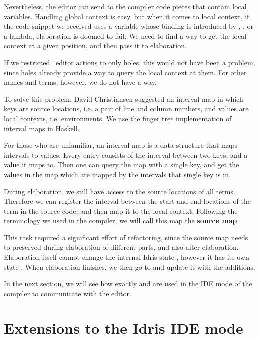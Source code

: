 Nevertheless, the editor can send to the compiler code pieces that contain local variables.
Handling global context is easy, but when it comes to local context, if the
code snippet we received uses a variable whose binding is introduced by
, , or a lambda, elaboration is doomed to fail.
We need to find a way to get the local context at a given position, and then
pass it to elaboration.

If we restricted \Elab\ editor actions to only holes, this would not have been
a problem, since holes already provide a way to query the local context at
them. For other names and terms, however, we do not have a way.

To solve this problem, David Christiansen suggested an interval map in which
keys are source locations, i.e. a pair of line and column numbers, and values
are local contexts, i.e. environments. We use the finger tree implementation of
interval maps in Haskell.\cite{fingertrees}

For those who are unfamiliar, an interval map is a data structure that maps
intervals to values. Every entry consists of the interval between two keys, and
a value it maps to. Then one can query the map with a single key, and get the
values in the map which are mapped by the intervals that single key is in.

During elaboration, we still have access to the source locations of all terms.
Therefore we can register the interval between the start and end locations of
the term in the source code, and then map it to the local context.
Following the terminology we used in the compiler, we will call this map the
\textbf{source map}.

This task required a significant effort of refactoring, since the source map
needs to preserved during elaboration of different parts, and also after
elaboration. Elaboration itself cannot change the internal Idris state
, however it has its own state . When elaboration
finishes, we then go to  and update it with the additions.

In the next section, we will see how exactly  and 
are used in the IDE mode of the compiler to communicate with the editor.

\section{Extensions to the Idris IDE mode}\label{sec:idemode}

